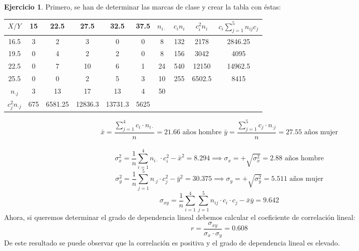 \documentclass[a4paper, 12pt]{article}
\theoremstyle{definition}
\newtheorem{ej}{Ejercicio}
\begin{document}
\begin{ej}
Primero, se han de determinar las marcas de clase y crear la tabla con éstas:
\begin{center}
\begin{tabular}{c|ccccc|cccc}
	\(X/Y\) & 15 & 22.5 & 27.5 & 32.5 & 37.5 & $n_{i \cdot} $ & $c_i n_i$ & $c_i^2 n_i$ & $c_i \displaystyle\sum_{j=1}^5 n_{ij} c_j$\\
	\hline
	16.5 & 3 & 2 & 3 & 0 & 0 & 8 & 132 & 2178 & 2846.25 \\
	19.5 & 0 & 4 & 2 & 2 & 0 & 8 & 156 & 3042 & 4095 \\
	22.5 & 0 & 7 & 10 & 6 & 1 & 24 & 540 & 12150 & 14962.5 \\
	25.5 & 0 & 0 & 2 & 5 & 3 & 10 & 255 & 6502.5 & 8415 \\
	\hline
	$n_{\cdot j}$ & 3 & 13 & 17 & 13 & 4 & 50 &  &  & \vline 30318.75 \vline \\
	$c_j^2  n_{\cdot j}$ & 675 & 6581.25 & 12836.3 & 13731.3 & 5625 &  &  &  &  \\
\end{tabular}
\end{center}
$$\bar{x} = \dfrac{\displaystyle\sum_{j=1}^4 c_i \cdot n_{i \cdot}}{n} = 21.66 \text{ años hombre   } \bar{y} = \dfrac{\displaystyle\sum_{j=1}^5 c_j \cdot n_{\cdot j}}{n} = 27.55 \text{ años mujer}$$
\\
$$\sigma_x^2 = \frac{1}{n}\displaystyle\sum_{i=1}^4 n_{i \cdot} \cdot c_i^2 - \bar{x}^2 = 8.294 \implies \sigma_x = +\sqrt{\sigma_x^2} = 2.88 \text{ años hombre}$$
$$\sigma_y^2 = \frac{1}{n}\displaystyle\sum_{j=1}^5 n_{\cdot j} \cdot c_j^2 - \bar{y}^2 = 30.375 \implies \sigma_y = +\sqrt{\sigma_y^2} = 5.511 \text{ años mujer}$$
$$\sigma_{xy} = \frac{1}{n} \displaystyle \sum_{i=1}^4 \sum_{j=1}^5 n_{ij} \cdot c_i \cdot c_j -\bar{x}\bar{y} = 9.642$$
Ahora, si queremos determinar el grado de dependencia lineal debemos calcular el coeficiente de correlación lineal:
$$r = \dfrac{\sigma_{xy}}{\sigma_x \cdot \sigma_y} = 0.608$$
De este resultado se puede observar que la correlación es positiva y el grado de dependencia lineal es elevado.
\end{ej}

\bigskip
\end{document}
